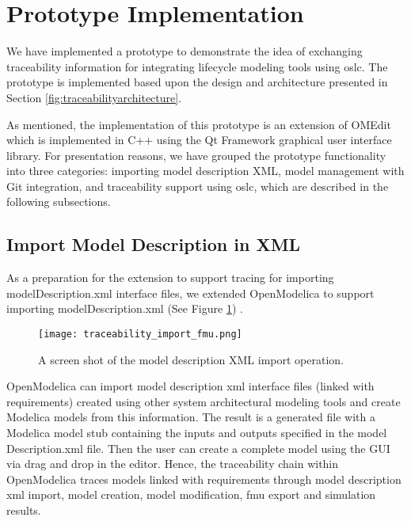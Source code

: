 \section{Prototype Implementation}
\label{sec:tracaebilityprototype}

We have implemented a prototype to demonstrate the idea of exchanging traceability information for
integrating lifecycle modeling tools using \acrshort{oslc}. The prototype is implemented based upon the design and
architecture presented in Section \ref{fig:traceabilityarchitecture}.

As mentioned, the implementation of this prototype is an extension of OMEdit which
is implemented in C++ using the Qt Framework graphical user interface library. For presentation reasons, we have grouped the prototype functionality into three categories: importing model description XML, model management with Git integration, and traceability support using \acrshort{oslc}, 
which are described in the following subsections.


\subsection{Import Model Description in XML}
\label{ssec:tracaebilityimprtxml}

As a preparation for the extension to support tracing for importing modelDescription.xml interface files, we 
extended OpenModelica to support importing modelDescription.xml (See Figure \ref{fig:traceabilityimportfmu}) . 

\begin{figure}
	\texttt{[image: traceability\_import\_fmu.png]}
	\caption{A screen shot of the model description XML import operation.}
	\label{fig:traceabilityimportfmu}
\end{figure}

OpenModelica can import model description \acrshort{xml} interface files (linked with requirements) created using
other system architectural modeling tools and create  Modelica models from this information. The result is a
generated file with a Modelica model stub containing the inputs and outputs specified in the model
Description.xml file. Then the user can create a complete model using the GUI via drag and drop in the
editor. Hence, the traceability chain within OpenModelica traces models linked with requirements
through model description \acrshort{xml} import, model creation, model modification, \acrshort{fmu} export and simulation results.

